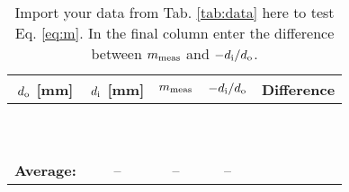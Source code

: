 \documentclass[12pt,twocolumn]{article}
\begin{document}
\begin{table}[hb]
\footnotesize
\centering
\begin{tabular}{| c | c | c | c | c |}
\hline
\textbf{$d_{\rm o}$ [mm]} & \textbf{$d_{\rm i}$ [mm]} & \textbf{$m_{\rm meas}$} & \textbf{$-d_{\rm i}/d_{\rm o}$} & \textbf{Difference} \\ \hline
 & & & & \\ \hline
 & & & & \\ \hline
 & & & & \\ \hline
 & & & & \\ \hline
 & & & & \\ \hline
 & & & & \\ \hline
 & & & & \\ \hline
 & & & & \\ \hline
 & & & & \\ \hline
 & & & & \\ \hline \hline
 \textbf{Average:} & -- & -- & -- & \\ \hline
\end{tabular}
\caption{\label{tab:data2} Import your data from Tab. \ref{tab:data} here to test Eq. \ref{eq:m}.  In the final column enter the difference between $m_{\rm meas}$ and $-d_{\rm i}/d_{\rm o}$.}
\end{table}
\end{document}
